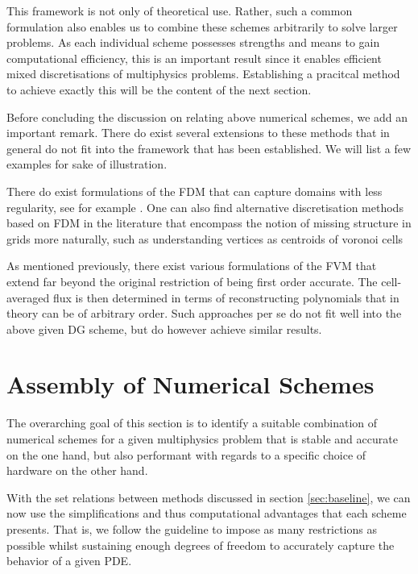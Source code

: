 \documentclass[sn-mathphys,Numbered]{sn-jnl}%
\theoremstyle{thmstyleone}%
\theoremstyle{thmstyletwo}%
\theoremstyle{thmstylethree}%
\begin{document}
This framework is not only of theoretical use.
Rather, such a common formulation also enables us to combine these schemes arbitrarily to solve larger problems.
As each individual scheme possesses strengths and means to gain computational efficiency, this is an important result since it enables efficient mixed discretisations of multiphysics problems.
Establishing a pracitcal method to achieve exactly this will be the content of the next section.

Before concluding the discussion on relating above numerical schemes, we add an important remark.
There do exist several extensions to these methods that in general do not fit into the framework that has been established.
We will list a few examples for sake of illustration.

There do exist formulations of the FDM that can capture domains with less regularity, see for example \cite{fornbergGenerationFiniteDifference1988,visbalUseHigherOrderFiniteDifference2002,zhangThreedimensionalElasticWave2012}.
One can also find alternative discretisation methods based on FDM in the literature that encompass the notion of missing structure in grids more naturally, such as understanding vertices as centroids of voronoi cells \cite{sukumarVoronoiCellFinite2003}

As mentioned previously, there exist various formulations of the FVM that extend far beyond the original restriction of being first order accurate.
The cell-averaged flux is then determined in terms of reconstructing polynomials that in theory can be of arbitrary order.
Such approaches per se do not fit well into the above given DG scheme, but do however achieve similar results.

\section{Assembly of Numerical Schemes}

The overarching goal of this section is to identify a suitable combination of numerical schemes for a given multiphysics problem that is stable and accurate on the one hand, but also performant with regards to a specific choice of hardware on the other hand.

With the set relations between methods discussed in section \ref{sec:baseline}, we can now use the simplifications and thus computational advantages that each scheme presents.
That is, we follow the guideline to impose as many restrictions as possible whilst sustaining enough degrees of freedom to accurately capture the behavior of a given PDE.
\end{document}
